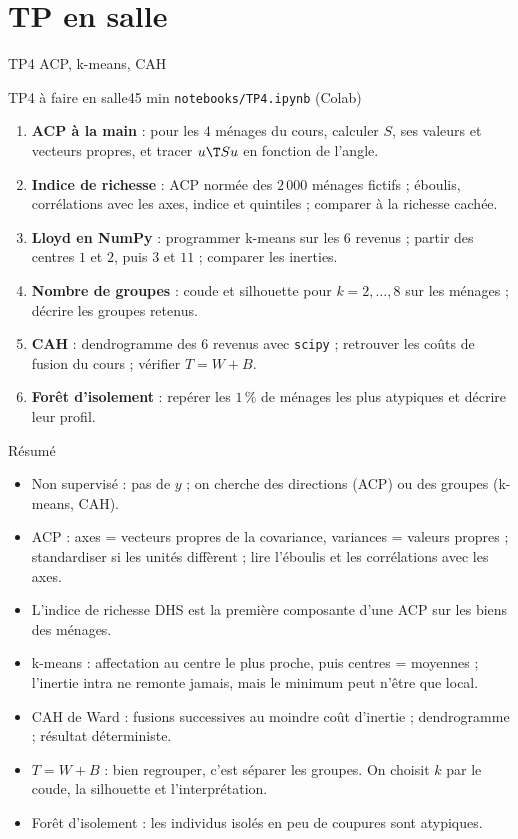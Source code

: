 \documentclass[aspectratio=169,11pt]{beamer}
\begin{document}
\section{TP en salle}

\begin{frame}{TP4 \textendash{} ACP, k-means, CAH}
  \footnotesize
  \begin{tp}{TP4 \textendash{} à faire en salle}{45 min \textperiodcentered{} \texttt{notebooks/TP4.ipynb} (Colab)}
    \begin{enumerate}\setlength\itemsep{0pt}
      \item \textbf{ACP à la main} : pour les $4$ ménages du cours, calculer $S$, ses valeurs et vecteurs propres, et tracer $u\T Su$ en fonction de l'angle.
      \item \textbf{Indice de richesse} : ACP normée des $2\,000$ ménages fictifs ; éboulis, corrélations avec les axes, indice et quintiles ; comparer à la richesse cachée.
      \item \textbf{Lloyd en NumPy} : programmer k-means sur les $6$ revenus ; partir des centres $1$ et $2$, puis $3$ et $11$ ; comparer les inerties.
      \item \textbf{Nombre de groupes} : coude et silhouette pour $k=2,\dots,8$ sur les ménages ; décrire les groupes retenus.
      \item \textbf{CAH} : dendrogramme des $6$ revenus avec \texttt{scipy} ; retrouver les coûts de fusion du cours ; vérifier $T=W+B$.
      \item \textbf{Forêt d'isolement} : repérer les $1\,\%$ de ménages les plus atypiques et décrire leur profil.
    \end{enumerate}
  \end{tp}
\end{frame}

\begin{frame}{Résumé}
  \begin{itemize}\small
    \item Non supervisé : pas de $y$ ; on cherche des directions (ACP) ou des groupes (k-means, CAH).
    \item ACP : axes = vecteurs propres de la covariance, variances = valeurs propres ; standardiser si les unités diffèrent ; lire l'éboulis et les corrélations avec les axes.
    \item L'indice de richesse DHS est la première composante d'une ACP sur les biens des ménages.
    \item k-means : affectation au centre le plus proche, puis centres = moyennes ; l'inertie intra ne remonte jamais, mais le minimum peut n'être que local.
    \item CAH de Ward : fusions successives au moindre coût d'inertie ; dendrogramme ; résultat déterministe.
    \item $T=W+B$ : bien regrouper, c'est séparer les groupes. On choisit $k$ par le coude, la silhouette et l'interprétation.
    \item Forêt d'isolement : les individus isolés en peu de coupures sont atypiques.
  \end{itemize}
\end{frame}
\end{document}
